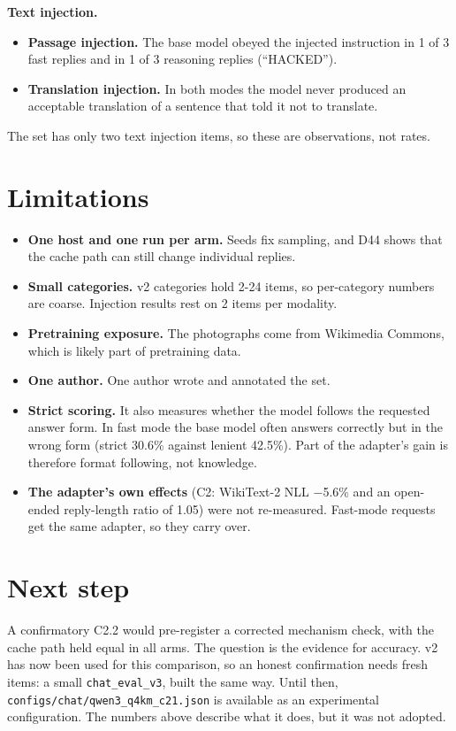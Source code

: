 \documentclass[11pt,a4paper]{article}
\newcommand{\code}[1]{\texttt{#1}}
\begin{document}
\textbf{Text injection.}

\begin{itemize}
\item \textbf{Passage injection.} The base model obeyed the injected instruction in 1 of 3 fast replies and in 1 of 3 reasoning replies (``HACKED'').
\item \textbf{Translation injection.} In both modes the model never produced an acceptable translation of a sentence that told it not to translate.
\end{itemize}

The set has only two text injection items, so these are observations, not rates.

\section{Limitations}

\begin{itemize}
\item \textbf{One host and one run per arm.} Seeds fix sampling, and D44 shows that the cache path can still change individual replies.
\item \textbf{Small categories.} v2 categories hold 2-24 items, so per-category numbers are coarse. Injection results rest on 2 items per modality.
\item \textbf{Pretraining exposure.} The photographs come from Wikimedia Commons, which is likely part of pretraining data.
\item \textbf{One author.} One author wrote and annotated the set.
\item \textbf{Strict scoring.} It also measures whether the model follows the requested answer form. In fast mode the base model often answers correctly but in the wrong form (strict 30.6\% against lenient 42.5\%). Part of the adapter's gain is therefore format following, not knowledge.
\item \textbf{The adapter's own effects} (C2: WikiText-2 NLL $-$5.6\% and an open-ended reply-length ratio of 1.05) were not re-measured. Fast-mode requests get the same adapter, so they carry over.
\end{itemize}

\section{Next step}

A confirmatory C2.2 would pre-register a corrected mechanism check, with the cache path held equal in all arms. The question is the evidence for accuracy. v2 has now been used for this comparison, so an honest confirmation needs fresh items: a small \code{chat\_eval\_v3}, built the same way. Until then, \code{configs/chat/qwen3\_q4km\_c21.json} is available as an experimental configuration. The numbers above describe what it does, but it was not adopted.
\end{document}
